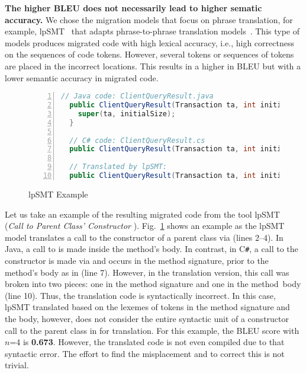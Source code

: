 {\bf The higher BLEU does not necessarily lead to higher sematic
  accuracy.}  We chose the migration models that focus on phrase
translation, for example, lpSMT~\cite{fse13-nier,karaivanov14} that
adapts phrase-to-phrase translation models~\cite{phrasal10}. This type
of models produces migrated code with high lexical accuracy, i.e.,
high correctness on the sequences of code tokens. However, several
tokens or sequences of tokens are placed in the incorrect locations.
This results in a higher in BLEU but with a lower semantic accuracy
in migrated code.


\begin{figure}[t]
\centering
\begin{lstlisting}[basicstyle=\small\sffamily, stepnumber=1, numbers=left, language=Java, aboveskip=1pt,  belowskip=1pt, numbersep=-5pt]
  // Java code: ClientQueryResult.java
  public ClientQueryResult(Transaction ta, int initialSize){
    super(ta, initialSize);
  }

  // C# code: ClientQueryResult.cs
  public ClientQueryResult(Transaction ta, int initialSize) : base(ta, initialSize) {}

  // Translated by lpSMT:
  public ClientQueryResult(Transaction ta, int initialSize) : base(ta {, initialSize) ; }
\end{lstlisting}
\caption{lpSMT Example~\cite{fse13-nier}}
\label{fig:issueexample2}
\end{figure}


Let us take an example of the resulting migrated code from the tool
lpSMT~\cite{fse13-nier} ({\em Call to Parent Class' Constructor
  }). Fig.~\ref{fig:issueexample2} shows an example
as the lpSMT model translates a call to the constructor of a parent
class via  (lines 2--4). In Java, a call to  is
made inside the method's body. In contrast, in C\texttt{\#}, a call to the
constructor is made via  and occurs in the method
signature, \ie prior to the method's body as in
 (line 7). However, in the translation
version, this call was broken into two pieces: one in the method
signature  and one in the method~body\\  (line 10). Thus, the translation code is
syntactically incorrect. In this case, lpSMT translated based on the
lexemes of tokens in the method signature and the body, however, does
not consider the entire syntactic unit of a constructor call to the
parent class in  for translation. For this example, the
BLEU score with $n$=4 is {\bf 0.673}. However, the translated code is not even
compiled due to that syntactic error. The effort to find the
misplacement and to correct this is not trivial.

